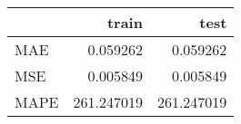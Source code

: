 \begin{tabular}{lrr}
\toprule
{} &       train &        test \\
\midrule
MAE  &    0.059262 &    0.059262 \\
MSE  &    0.005849 &    0.005849 \\
MAPE &  261.247019 &  261.247019 \\
\bottomrule
\end{tabular}
